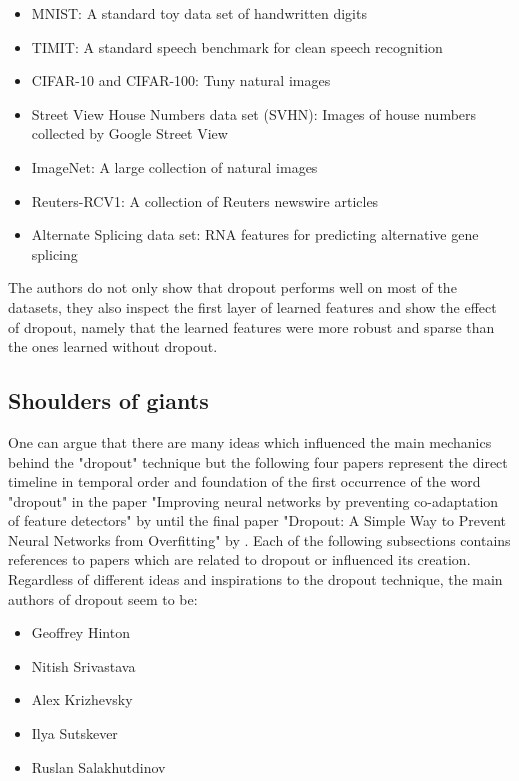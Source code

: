 \documentclass[a4paper]{article}
\begin{document}
\begin{itemize}
	\item MNIST: A standard toy data set of handwritten digits
	\item TIMIT: A standard speech benchmark for clean speech recognition
	\item CIFAR-10 and CIFAR-100: Tuny natural images
	\item Street View House Numbers data set (SVHN): Images of house numbers collected by Google Street View
	\item ImageNet: A large collection of natural images
	\item Reuters-RCV1: A collection of Reuters newswire articles
	\item Alternate Splicing data set: RNA features for predicting alternative gene splicing
\end{itemize}

The authors do not only show that dropout performs well on most of the datasets, they also inspect the first layer of learned features and show the effect of dropout, namely that the learned features were more robust and sparse than the ones learned without dropout.



\subsection{Shoulders of giants}

One can argue that there are many ideas which influenced the main mechanics behind the "dropout" technique but the following four papers represent the direct timeline in temporal order and foundation of the first occurrence of the word "dropout" in the paper "Improving neural networks by preventing co-adaptation of feature detectors" by \cite{DBLP:journals/corr/abs-1207-0580} until the final paper "Dropout: A Simple Way to Prevent Neural Networks from Overfitting" by \cite{Srivastava_improvingneural}. Each of the following subsections contains references to papers which are related to dropout or influenced its creation. Regardless of different ideas and inspirations to the dropout technique, the main authors of dropout seem to be:

\begin{itemize}
	\item Geoffrey Hinton
	\item Nitish Srivastava
	\item Alex Krizhevsky
	\item Ilya Sutskever
	\item Ruslan Salakhutdinov
\end{itemize}
\end{document}
